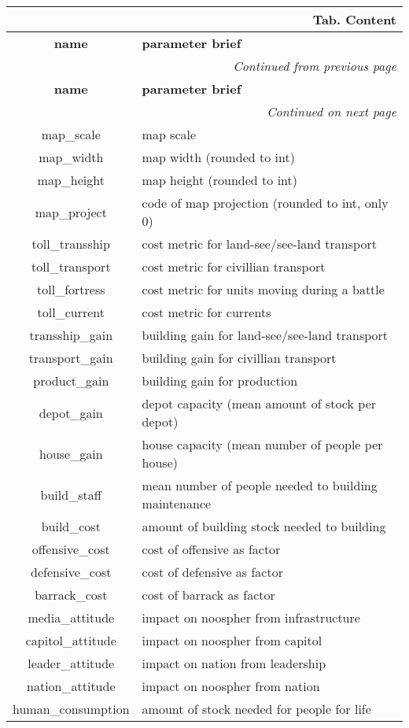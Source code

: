 \documentclass[a4paper,oneside,titlepage]{report}
\newcommand*{\LTHeaderII}[3]{
  \multicolumn{2}{r}{\textbf{Tab. \thesubsection} \textbf{#1}}\\    
  \hline
  \textbf{#2} & \textbf{#3}\\
  \hline

  \endfirsthead
  \multicolumn{2}{r}{\textit{Continued from previous page}}\\    
  \hline
  \textbf{#2} & \textbf{#3}\\
  \hline
  \endhead
  \hline
  \multicolumn{2}{r}{\textit{Continued on next page}}\\
  \endfoot
  \hline
  \endlastfoot  
}
\begin{document}
  \vspace{-0.5cm}
  \begin{longtable}{ |c|l| } 
    \LTHeaderII{Content}{name}{parameter brief}                    
    map\_scale  & map scale\\
    map\_width  & map width (rounded to int)\\
    map\_height  & map height (rounded to int)\\
    map\_project  & code of map projection (rounded to int, only 0)\\
    \hline
    toll\_transship  & cost metric for land-see$/$see-land transport\\
    toll\_transport  & cost metric for civillian transport\\
    toll\_fortress  & cost metric for units moving during a battle\\      
    toll\_current  & cost metric for currents\\      
    \hline
    transship\_gain  & building gain for land-see$/$see-land transport\\
    transport\_gain  & building gain for civillian transport\\
    product\_gain  & building gain for production\\
    depot\_gain  & depot capacity (mean amount of stock per depot)\\      
    house\_gain  & house capacity (mean number of people per house)\\      
    \hline
    build\_staff & mean number of people needed to building maintenance\\      
    build\_cost & amount of building stock needed to building\\      
    \hline
    offensive\_cost & cost of offensive as factor\\      
    defensive\_cost & cost of defensive as factor\\      
    barrack\_cost  & cost of barrack as factor\\      
    \hline
    media\_attitude & impact on noospher from infrastructure\\      
    capitol\_attitude & impact on noospher from capitol\\      
    leader\_attitude & impact on nation from leadership\\      
    nation\_attitude & impact on noospher from nation\\      
    \hline
    human\_consumption & amount of stock needed for people for life\\      

\end{longtable}
\end{document}
